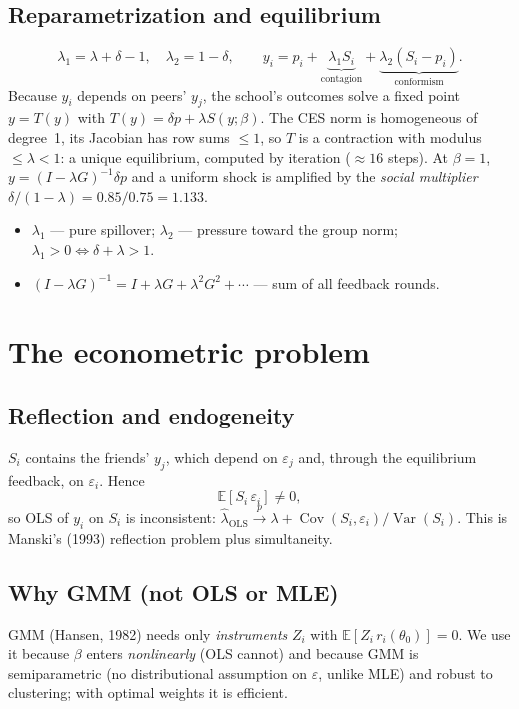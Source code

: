 \documentclass[11pt]{article}
\newcommand{\E}{\mathbb{E}}
\newenvironment{where}{\par\nobreak\vspace{-0.2em}\begin{itemize}[leftmargin=1.5em,itemsep=1pt,topsep=2pt,parsep=0pt,label=\textcolor{accent}{\textbullet}]\small}{\end{itemize}\vspace{0.2em}}
\begin{document}
\subsection{Reparametrization and equilibrium}
\begin{equation}
\lambda_1=\lambda+\delta-1,\quad \lambda_2=1-\delta,\qquad
y_i = p_i + \underbrace{\lambda_1 S_i}_{\text{contagion}} + \underbrace{\lambda_2(S_i-p_i)}_{\text{conformism}} .
\end{equation}
Because $y_i$ depends on peers' $y_j$, the school's outcomes solve a fixed point $y=T(y)$ with $T(y)=\delta p+\lambda S(y;\beta)$. The CES norm is homogeneous of degree~1, its Jacobian has row sums $\le 1$, so $T$ is a contraction with modulus $\le\lambda<1$: a unique equilibrium, computed by iteration ($\approx 16$ steps). At $\beta=1$, $y=(I-\lambda G)^{-1}\delta p$ and a uniform shock is amplified by the \emph{social multiplier} $\delta/(1-\lambda)=0.85/0.75=1.133$.
\begin{where}
\item $\lambda_1$ --- pure spillover; $\lambda_2$ --- pressure toward the group norm; $\lambda_1>0\iff\delta+\lambda>1$.
\item $(I-\lambda G)^{-1}=I+\lambda G+\lambda^2G^2+\cdots$ --- sum of all feedback rounds.
\end{where}
\section{The econometric problem}
\subsection{Reflection and endogeneity}
$S_i$ contains the friends' $y_j$, which depend on $\varepsilon_j$ and, through the equilibrium feedback, on $\varepsilon_i$. Hence
\begin{equation}
\E[S_i\,\varepsilon_i]\neq 0 ,
\end{equation}
so OLS of $y_i$ on $S_i$ is inconsistent: $\hat\lambda_{\text{OLS}}\xrightarrow{p}\lambda+\operatorname{Cov}(S_i,\varepsilon_i)/\operatorname{Var}(S_i)$. This is Manski's (1993) reflection problem plus simultaneity.

\subsection{Why GMM (not OLS or MLE)}
GMM (Hansen, 1982) needs only \emph{instruments} $Z_i$ with $\E[Z_i\,r_i(\theta_0)]=0$. We use it because $\beta$ enters \emph{nonlinearly} (OLS cannot) and because GMM is semiparametric (no distributional assumption on $\varepsilon$, unlike MLE) and robust to clustering; with optimal weights it is efficient.
\end{document}
